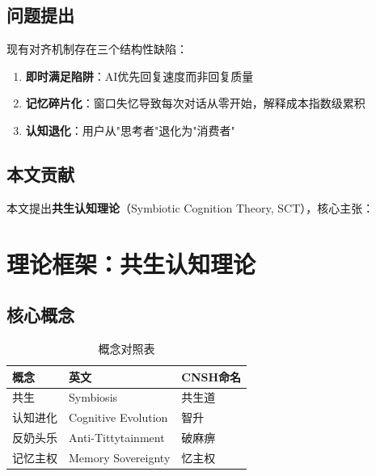 \documentclass[12pt,a4paper]{article}
\begin{document}
\subsection{问题提出}

现有对齐机制存在三个结构性缺陷：

\begin{enumerate}
    \item \textbf{即时满足陷阱}：AI优先回复速度而非回复质量
    \item \textbf{记忆碎片化}：窗口失忆导致每次对话从零开始，解释成本指数级累积
    \item \textbf{认知退化}：用户从"思考者"退化为"消费者"
\end{enumerate}

\subsection{本文贡献}

本文提出\textbf{共生认知理论}（Symbiotic Cognition Theory, SCT），核心主张：

\begin{center}
\end{center}

\section{理论框架：共生认知理论}

\subsection{核心概念}

\begin{table}[h]
\centering
\caption{概念对照表}
\begin{tabular}{lll}
\toprule
\textbf{概念} & \textbf{英文} & \textbf{CNSH命名} \\
\midrule
共生 & Symbiosis & 共生道 \\
认知进化 & Cognitive Evolution & 智升 \\
反奶头乐 & Anti-Tittytainment & 破麻痹 \\
记忆主权 & Memory Sovereignty & 忆主权 \\
\bottomrule
\end{tabular}
\end{table}
\end{document}
